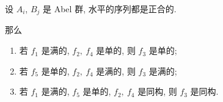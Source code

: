 \begin{Lemma}[五引理]
	设 $ A_i $, $ B_j $ 是 Abel 群, 水平的序列都是正合的.
	\begin{center}
	\end{center}
	那么
	\begin{enumerate}
		\item 若 $ f_1 $ 是满的, $ f_2,\ f_4 $ 是单的, 则 $ f_3 $ 是单的;
		\item 若 $ f_5 $ 是单的, $ f_2,\ f_4 $ 是满的, 则 $ f_3 $ 是满的;
		\item 若 $ f_1 $ 是满的, $ f_5 $ 是单的, $ f_2,\ f_4 $ 是同构, 则 $ f_3 $ 是同构.
	\end{enumerate}
\end{Lemma}
